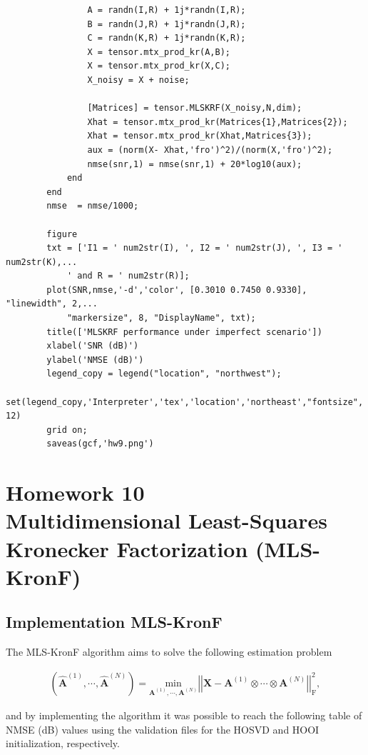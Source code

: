 \documentclass[a4paper,10pt]{article}
\begin{document}
\begin{verbatim}
                A = randn(I,R) + 1j*randn(I,R);
                B = randn(J,R) + 1j*randn(J,R);
                C = randn(K,R) + 1j*randn(K,R);
                X = tensor.mtx_prod_kr(A,B);
                X = tensor.mtx_prod_kr(X,C);
                X_noisy = X + noise;
                
                [Matrices] = tensor.MLSKRF(X_noisy,N,dim);
                Xhat = tensor.mtx_prod_kr(Matrices{1},Matrices{2});
                Xhat = tensor.mtx_prod_kr(Xhat,Matrices{3});
                aux = (norm(X- Xhat,'fro')^2)/(norm(X,'fro')^2);
                nmse(snr,1) = nmse(snr,1) + 20*log10(aux);
            end
        end
        nmse  = nmse/1000;

        figure
        txt = ['I1 = ' num2str(I), ', I2 = ' num2str(J), ', I3 = ' num2str(K),...
            ' and R = ' num2str(R)];
        plot(SNR,nmse,'-d','color', [0.3010 0.7450 0.9330], "linewidth", 2,...
            "markersize", 8, "DisplayName", txt);
        title(['MLSKRF performance under imperfect scenario'])
        xlabel('SNR (dB)')
        ylabel('NMSE (dB)')
        legend_copy = legend("location", "northwest");
        set(legend_copy,'Interpreter','tex','location','northeast',"fontsize", 12)
        grid on;
        saveas(gcf,'hw9.png')
    \end{verbatim}
    
\newpage
\section*{Homework 10 \\ Multidimensional Least-Squares Kronecker Factorization
(MLS-KronF)}

    \subsection*{Implementation MLS-KronF}

    The MLS-KronF algorithm aims to solve the following estimation problem 

    \begin{align}
        \left(\hat{\boldsymbol{A}}^{(1)}, \cdots, \hat{\boldsymbol{A}}^{(N)}\right) = \underset{\boldsymbol{A}^{(1)}, \cdots, \boldsymbol{A}^{(N)}}{\text{min}} \left|\left| \boldsymbol{X} - \boldsymbol{A}^{(1)} \otimes \cdots \otimes \boldsymbol{A}^{(N)} \right|\right|^2_{\text{F}},
    \end{align}

    and by implementing the algorithm it was possible to reach the following table of NMSE (dB) values using the validation files 
    for the HOSVD and HOOI initialization, respectively.
\end{document}
